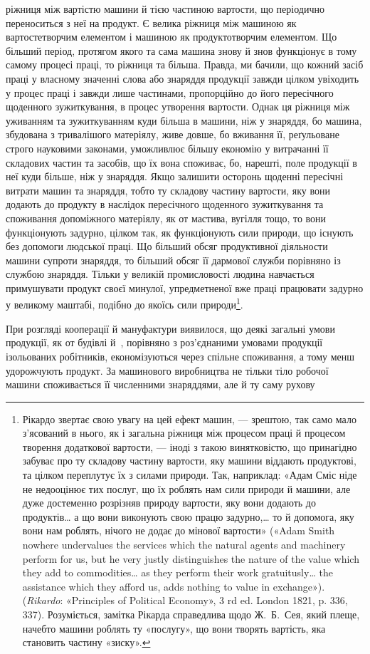 \parcont{}  %
ріжниця між вартістю машини й тією частиною вартости, що
періодично переноситься з неї на продукт. Є велика ріжниця між
машиною як вартостетворчим елементом і машиною як продуктотворчим
елементом. Що більший період, протягом якого та сама
машина знову й знов функціонує в тому самому процесі праці,
то ріжниця та більша. Правда, ми бачили, що кожний засіб праці
у власному значенні слова або знаряддя продукції завжди цілком
увіходить у процес праці і завжди лише частинами, пропорційно
до його пересічного щоденного зужиткування, в процес утворення
вартости. Однак ця ріжниця між уживанням та зужиткуванням
куди більша в машини, ніж у знаряддя, бо машина, збудована
з тривалішого матеріялу, живе довше, бо вживання її, реґульоване
строго науковими законами, уможливлює більшу економію
у витрачанні її складових частин та засобів, що їх вона споживає,
бо, нарешті, поле продукції в неї куди більше, ніж у знаряддя.
Якщо залишити осторонь щоденні пересічні витрати машин та
знаряддя, тобто ту складову частину вартости, яку вони додають
до продукту в наслідок пересічного щоденного зужиткування
та споживання допоміжного матеріялу, як от мастива, вугілля
тощо, то вони функціонують задурно, цілком так, як функціонують
сили природи, що існують без допомоги людської праці.
Що більший обсяг продуктивної діяльности машини супроти
знаряддя, то більший обсяг її дармової служби порівняно із
службою знаряддя. Тільки у великій промисловості людина
навчається примушувати продукт своєї минулої, упредметненої
вже праці працювати задурно у великому маштабі, подібно до
якоїсь сили природи\footnote{
Рікардо звертає свою увагу на цей ефект машин, — зрештою,
так само мало з’ясований в нього, як і загальна ріжниця між процесом
праці й процесом творення додаткової вартости, — іноді з такою винятковістю,
що принагідно забуває про ту складову частину вартости, яку
машини віддають продуктові, та цілком переплутує їх з силами природи.
Так, наприклад: «Адам Сміс ніде не недооцінює тих послуг, що їх роблять
нам сили природи й машини, але дуже достеменно розрізняв природу
вартости, яку вони додають до продуктів\dots{} а що вони виконують свою
працю задурно,\dots{} то й допомога, яку вони нам роблять, нічого не додає
до мінової вартости» («Adam Smith nowhere undervalues the services
which the natural agents and machinery perform for us, but he very justly
distinguishes the nature of the value which they add to commodities\dots{} as
they perform their work gratuitusly\dots{} the assistance which they afford
us, adds nothing to value in exchange»). (\emph{Rikardo}: «Principles of
Political Economy», 3 rd ed. London 1821, p. 336, 337). Розуміється,
замітка Рікарда справедлива щодо Ж.~Б.~Сея, який плеще, начебто машини
роблять ту «послугу», що вони творять вартість, яка становить
частину «зиску».
}.

При розгляді кооперації й мануфактури виявилося, що деякі
загальні умови продукції, як от будівлі й~, порівняно з роз’єднаними
умовами продукції ізольованих робітників, економізуються
через спільне споживання, а тому менш удорожчують продукт.
За машинового виробництва не тільки тіло робочої машини
споживається її численними знаряддями, але й ту саму рухову
\parbreak{}  %
